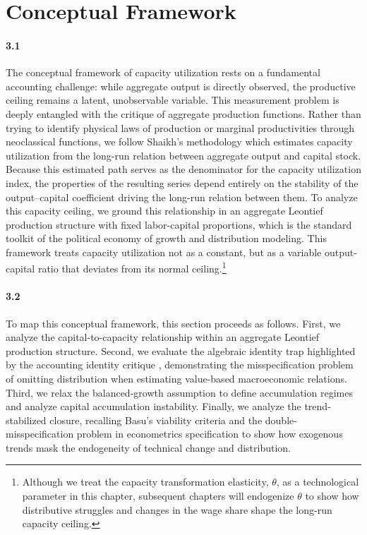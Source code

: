 \section{Conceptual Framework}
\label{sec:conceptual_framework}

\paragraph{3.1}
The conceptual framework of capacity utilization rests on a fundamental accounting challenge: while aggregate output is directly observed, the productive ceiling remains a latent, unobservable variable. This measurement problem is deeply entangled with the critique of aggregate production functions. Rather than trying to identify physical laws of production or marginal productivities through neoclassical functions, we follow Shaikh's methodology which estimates capacity utilization from the long-run relation between aggregate output and capital stock. Because this estimated path serves as the denominator for the capacity utilization index, the properties of the resulting series depend entirely on the stability of the output--capital coefficient driving the long-run relation between them. To analyze this capacity ceiling, we ground this relationship in an aggregate Leontief production structure with fixed labor-capital proportions, which is the standard toolkit of the political economy of growth and distribution modeling. This framework treats capacity utilization not as a constant, but as a variable output-capital ratio that deviates from its normal ceiling.\footnote{Although we treat the capacity transformation elasticity, $\theta$, as a technological parameter in this chapter, subsequent chapters will endogenize $\theta$ to show how distributive struggles and changes in the wage share shape the long-run capacity ceiling.}

\paragraph{3.2}
To map this conceptual framework, this section proceeds as follows. First, we analyze the capital-to-capacity relationship within an aggregate Leontief production structure. Second, we evaluate the algebraic identity trap highlighted by the accounting identity critique \citep{Shaikh1974, Felipe2005}, demonstrating the misspecification problem of omitting distribution when estimating value-based macroeconomic relations. Third, we relax the balanced-growth assumption to define accumulation regimes and analyze capital accumulation instability. Finally, we analyze the trend-stabilized closure, recalling Basu's viability criteria and the double-misspecification problem in econometrics specification to show how exogenous trends mask the endogeneity of technical change and distribution.

